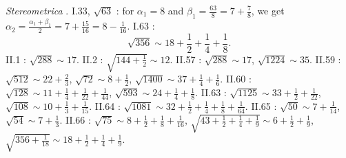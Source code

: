 \documentclass{article}
\theoremstyle{definition}
\begin{document}
{\em Stereometrica} \cite{heronisV}.
I.33, $\sqrt{63}$ \cite[pp.~34--35]{heronisV}: for
$\alpha_1=8$ and $\beta_1=\frac{63}{8}=7+\frac{7}{8}$, we get
$\alpha_2 = \frac{\alpha_1+\beta_1}{2} = 7+\frac{15}{16}=8-\frac{1}{16}$. 
I.63 \cite[p.~65]{heronisV}:
\[
\sqrt{356} \sim 18 + \frac{1}{2} + \frac{1}{4}+\frac{1}{8}.
\]
II.1 \cite[p.~85]{heronisV}: $\sqrt{288} \sim 17$.
II.2 \cite[p.~87]{heronisV}: $\sqrt{144+\frac{1}{2}} \sim 12$. 
II.57 \cite[p.~139]{heronisV}: $\sqrt{288} \sim 17$,
$\sqrt{1224} \sim 35$. 
II.59 \cite[p.~143]{heronisV}: $\sqrt{512} \sim 22+\frac{2}{3}$,
$\sqrt{72} \sim 8 + \frac{1}{2}$,
$\sqrt{1400} \sim 37+\frac{1}{4}+\frac{1}{6}$.
II.60 \cite[p.~147]{heronisV}: $\sqrt{128} \sim 11+\frac{1}{4}+\frac{1}{22}+\frac{1}{44}$,
$\sqrt{593} \sim 24+\frac{1}{4}+\frac{1}{8}$. 
II.63 \cite[pp.~151--153]{heronisV}: $\sqrt{1125} \sim 33+\frac{1}{2}+\frac{1}{22}$,
$\sqrt{108} \sim 10+\frac{1}{3}+\frac{1}{15}$. 
II.64 \cite[p.~153]{heronisV}: $\sqrt{1081} \sim 32+\frac{1}{2}+\frac{1}{4}+\frac{1}{8}+\frac{1}{64}$. 
II.65 \cite[p.~155]{heronisV}: $\sqrt{50} \sim 7+\frac{1}{14}$,
$\sqrt{54} \sim 7 + \frac{1}{3}$. 
II.66 \cite[p.~157]{heronisV}: $\sqrt{75} \sim 8+\frac{1}{2}+\frac{1}{8}+\frac{1}{16}$,
$\sqrt{43+\frac{1}{2}+\frac{1}{4}+\frac{1}{9}} \sim 6+\frac{1}{2}+\frac{1}{9}$,
$\sqrt{356+\frac{1}{18}} \sim 18+\frac{1}{2}+\frac{1}{4}+\frac{1}{9}$.
\end{document}
